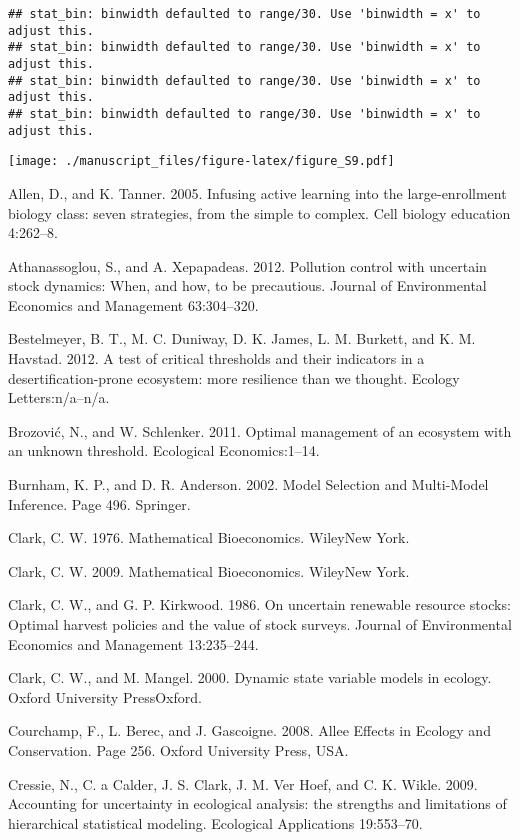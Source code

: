 \documentclass[]{components/elsarticle}
\begin{document}
\begin{verbatim}
## stat_bin: binwidth defaulted to range/30. Use 'binwidth = x' to adjust this.
## stat_bin: binwidth defaulted to range/30. Use 'binwidth = x' to adjust this.
## stat_bin: binwidth defaulted to range/30. Use 'binwidth = x' to adjust this.
## stat_bin: binwidth defaulted to range/30. Use 'binwidth = x' to adjust this.
\end{verbatim}

\texttt{[image: ./manuscript\_files/figure-latex/figure\_S9.pdf]}

Allen, D., and K. Tanner. 2005. Infusing active learning into the
large-enrollment biology class: seven strategies, from the simple to
complex. Cell biology education 4:262--8.

Athanassoglou, S., and A. Xepapadeas. 2012. Pollution control with
uncertain stock dynamics: When, and how, to be precautious. Journal of
Environmental Economics and Management 63:304--320.

Bestelmeyer, B. T., M. C. Duniway, D. K. James, L. M. Burkett, and K. M.
Havstad. 2012. A test of critical thresholds and their indicators in a
desertification-prone ecosystem: more resilience than we thought.
Ecology Letters:n/a--n/a.

Brozović, N., and W. Schlenker. 2011. Optimal management of an ecosystem
with an unknown threshold. Ecological Economics:1--14.

Burnham, K. P., and D. R. Anderson. 2002. Model Selection and
Multi-Model Inference. Page 496. Springer.

Clark, C. W. 1976. Mathematical Bioeconomics. WileyNew York.

Clark, C. W. 2009. Mathematical Bioeconomics. WileyNew York.

Clark, C. W., and G. P. Kirkwood. 1986. On uncertain renewable resource
stocks: Optimal harvest policies and the value of stock surveys. Journal
of Environmental Economics and Management 13:235--244.

Clark, C. W., and M. Mangel. 2000. Dynamic state variable models in
ecology. Oxford University PressOxford.

Courchamp, F., L. Berec, and J. Gascoigne. 2008. Allee Effects in
Ecology and Conservation. Page 256. Oxford University Press, USA.

Cressie, N., C. a Calder, J. S. Clark, J. M. {Ver Hoef}, and C. K.
Wikle. 2009. Accounting for uncertainty in ecological analysis: the
strengths and limitations of hierarchical statistical modeling.
Ecological Applications 19:553--70.
\end{document}
